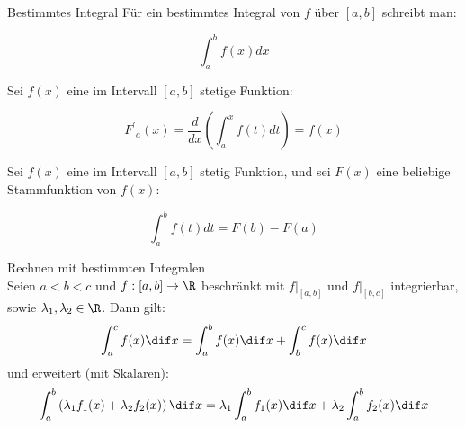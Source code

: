 \begin{definition}{Bestimmtes Integral}
    Für ein bestimmtes Integral von $f$ über $[a, b]$ schreibt man:

    $$\int_{a}^{b} f(x) d x$$
    
    Sei $f(x)$ eine im Intervall $[a, b]$ stetige Funktion:
    
    $$F^{\prime}{ }_{a}(x)=\frac{d}{d x}\left(\int_{a}^{x} f(t) d t\right)=f(x)$$

    Sei $f(x)$ eine im Intervall $[a, b]$ stetig Funktion, und sei $F(x)$ eine beliebige Stammfunktion von $f(x)$:

    $$\int_{a}^{b} f(t) d t=F(b)-F(a)$$
\end{definition}

\begin{concept}{Rechnen mit bestimmten Integralen}\\
	    Seien $a < b < c$ und $f: [a,b] \to \R$ beschränkt mit $f|_{[a,b]}$ und $f|_{[b,c]}$ integrierbar, sowie $\lambda_1, \lambda_2 \in \R$. Dann gilt:
    \begin{equation*}
    	\int_a^c f(x) \dif x = \int_a^b f(x) \dif x + \int_b^c f(x) \dif x
    \end{equation*}
    und erweitert (mit Skalaren):
    \begin{equation*}
    		\int_a^b \left( \lambda_1 f_1 (x) + \lambda_2 f_2 (x) \right) \dif x = \lambda_1 \int_a^b f_1(x) \dif x + \lambda_2 \int_a^b f_2(x) \dif x
    \end{equation*}
\end{concept}